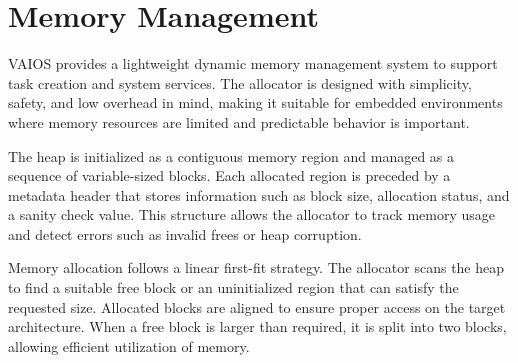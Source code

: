 \section{Memory Management}
\label{sec:vaios_memory}

VAIOS provides a lightweight dynamic memory management system to support task creation and system services. The allocator is designed with simplicity, safety, and low overhead in mind, making it suitable for embedded environments where memory resources are limited and predictable behavior is important.

The heap is initialized as a contiguous memory region and managed as a sequence of variable-sized blocks. Each allocated region is preceded by a metadata header that stores information such as block size, allocation status, and a sanity check value. This structure allows the allocator to track memory usage and detect errors such as invalid frees or heap corruption.

Memory allocation follows a linear first-fit strategy. The allocator scans the heap to find a suitable free block or an uninitialized region that can satisfy the requested size. Allocated blocks are aligned to ensure proper access on the target architecture. When a free block is larger than required, it is split into two blocks, allowing efficient utilization of memory.

